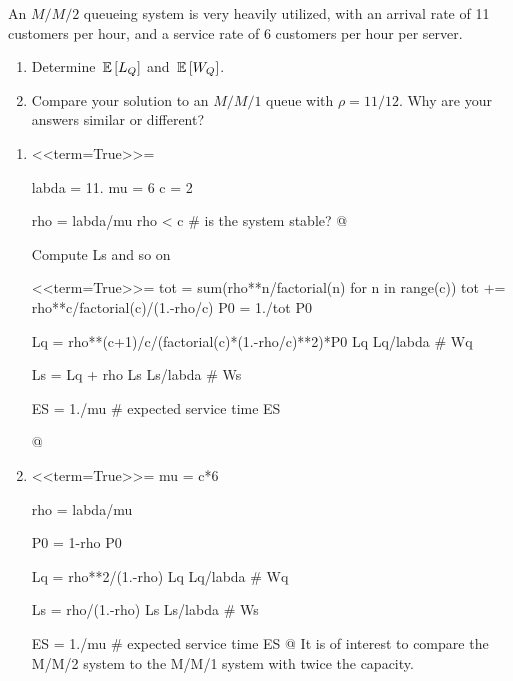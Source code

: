 \begin{question}
  An $M/M/2$ queueing system is very heavily utilized, with an arrival rate of 11 customers per hour, and a  service rate of 6 customers per hour per server.
  \begin{enumerate}
  \item Determine $\,\mathbb{E}\left[L_Q\right]$ and $\,\mathbb{E}\left[W_Q\right]$.
  \item Compare your solution to an $M/M/1$ queue with $\rho=11/12$. Why are your answers similar or different?
  \end{enumerate}
  \begin{solution}
  \begin{enumerate}
  \item 

<<term=True>>=

labda = 11.
mu = 6
c = 2

rho = labda/mu
rho < c  # is the system stable?
@ 

Compute Ls and so on


<<term=True>>=
tot = sum(rho**n/factorial(n) for n in range(c))
tot += rho**c/factorial(c)/(1.-rho/c)
P0 = 1./tot
P0

Lq = rho**(c+1)/c/(factorial(c)*(1.-rho/c)**2)*P0
Lq
Lq/labda # Wq

Ls = Lq + rho
Ls
Ls/labda # Ws

ES = 1./mu # expected service time
ES

@ 

\item 

<<term=True>>=
mu = c*6

rho = labda/mu

P0 = 1-rho
P0

Lq = rho**2/(1.-rho)
Lq
Lq/labda # Wq

Ls = rho/(1.-rho)
Ls
Ls/labda # Ws

ES = 1./mu # expected service time
ES
@ 
It is of interest to compare the M/M/2 system to the M/M/1 system with twice the capacity. 
  \end{enumerate}
    \end{solution}
\end{question}




